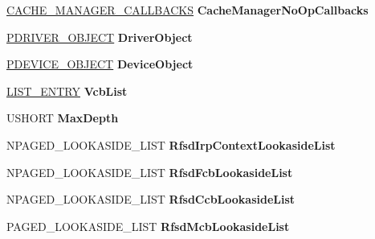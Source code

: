 \begin{DoxyCompactItemize}
\hyperlink{struct___c_a_c_h_e___m_a_n_a_g_e_r___c_a_l_l_b_a_c_k_s}{C\+A\+C\+H\+E\+\_\+\+M\+A\+N\+A\+G\+E\+R\+\_\+\+C\+A\+L\+L\+B\+A\+C\+KS} {\bfseries Cache\+Manager\+No\+Op\+Callbacks}
\item 
\mbox{\label{struct___r_f_s_d___g_l_o_b_a_l_a12de03c2cc624fae2813559bd5650fb1}} 
\hyperlink{struct___d_r_i_v_e_r___o_b_j_e_c_t}{P\+D\+R\+I\+V\+E\+R\+\_\+\+O\+B\+J\+E\+CT} {\bfseries Driver\+Object}
\item 
\mbox{\label{struct___r_f_s_d___g_l_o_b_a_l_a559dae7d6058d39e88a5a0f2ef135e1c}} 
\hyperlink{struct___d_e_v_i_c_e___o_b_j_e_c_t}{P\+D\+E\+V\+I\+C\+E\+\_\+\+O\+B\+J\+E\+CT} {\bfseries Device\+Object}
\item 
\mbox{\label{struct___r_f_s_d___g_l_o_b_a_l_abeecb551d07bdb05e6fd3d4b6dd94080}} 
\hyperlink{struct___l_i_s_t___e_n_t_r_y}{L\+I\+S\+T\+\_\+\+E\+N\+T\+RY} {\bfseries Vcb\+List}
\item 
\mbox{\label{struct___r_f_s_d___g_l_o_b_a_l_a8da8866a9b375f1fb3fd8a6ce22327bc}} 
U\+S\+H\+O\+RT {\bfseries Max\+Depth}
\item 
\mbox{\label{struct___r_f_s_d___g_l_o_b_a_l_a2b8b873d8bd2bd9aa8e3d03e15f38e4b}} 
N\+P\+A\+G\+E\+D\+\_\+\+L\+O\+O\+K\+A\+S\+I\+D\+E\+\_\+\+L\+I\+ST {\bfseries Rfsd\+Irp\+Context\+Lookaside\+List}
\item 
\mbox{\label{struct___r_f_s_d___g_l_o_b_a_l_a70099e72ba87b6cbe9e42dabc43e3e32}} 
N\+P\+A\+G\+E\+D\+\_\+\+L\+O\+O\+K\+A\+S\+I\+D\+E\+\_\+\+L\+I\+ST {\bfseries Rfsd\+Fcb\+Lookaside\+List}
\item 
\mbox{\label{struct___r_f_s_d___g_l_o_b_a_l_aeea294e52bd74e63f5444902bea0d474}} 
N\+P\+A\+G\+E\+D\+\_\+\+L\+O\+O\+K\+A\+S\+I\+D\+E\+\_\+\+L\+I\+ST {\bfseries Rfsd\+Ccb\+Lookaside\+List}
\item 
\mbox{\label{struct___r_f_s_d___g_l_o_b_a_l_a62d1285a68cd3837bf4dc335536946db}} 
P\+A\+G\+E\+D\+\_\+\+L\+O\+O\+K\+A\+S\+I\+D\+E\+\_\+\+L\+I\+ST {\bfseries Rfsd\+Mcb\+Lookaside\+List}

\end{DoxyCompactItemize}
